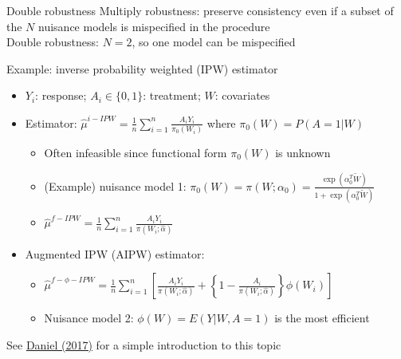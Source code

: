 \documentclass{beamer}
\newcommand{\sn}{\sum_{i=1}^n}
\newcommand{\f}[2]{\frac{#1}{#2}}
\begin{document}
\begin{frame}{Double robustness} \label{slide:doubleRobust}
  Multiply robustness: preserve consistency even if a subset of the $N$ nuisance models is mispecified in the procedure \\
  Double robustness: $N=2$, so one model can be mispecified \\
  \begin{block}{Example: inverse probability weighted (IPW) estimator}
    \begin{itemize}
      \item $Y_i$: response; $A_i \in \{0,1\}$: treatment; $W$: covariates
      \item Estimator: $\hat{\mu}^{i-IPW} = \f{1}{n} \sn \f{A_i Y_i}{\pi_0(W_i)}$ where $\pi_0(W) = P(A=1|W)$
      \begin{itemize}
        \item Often infeasible since functional form $\pi_0(W)$ is unknown
        \item (Example) nuisance model 1: $\pi_0(W) = \pi(W; \alpha_0) = \f{\exp(\alpha_0^T \tilde{W})}{1 +\exp(\alpha_0^T \tilde{W})}$
        \item $\hat{\mu}^{f-IPW} = \f{1}{n} \sn \f{A_i Y_i}{\pi(W_i; \hat{\alpha})}$
      \end{itemize}
      \item Augmented IPW (AIPW) estimator:
      \begin{itemize}
        \item $\hat{\mu}^{f-\phi-IPW} = \f{1}{n} \sn \left[ \f{A_i Y_i}{\pi(W_i; \hat{\alpha})} +\left\{ 1 -\f{A_i}{\pi(W_i; \hat{\alpha})} \right\} \phi(W_i) \right]$
        \item Nuisance model 2: $\phi(W)=E(Y|W,A=1)$ is the most efficient
      \end{itemize}
    \end{itemize}
  \end{block}
  See \href{https://statnav.files.wordpress.com/2017/10/doublerobustness-preprint.pdf}{Daniel (2017)} for a simple introduction to this topic
\end{frame}
\end{document}
